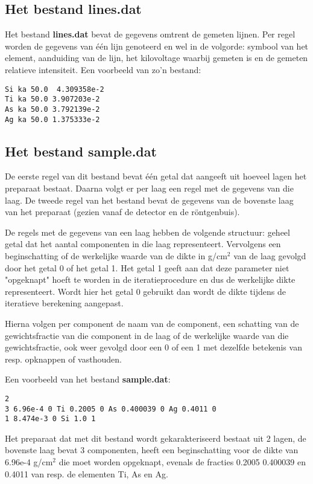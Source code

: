 \subsection*{Het bestand lines.dat}
Het bestand {\bf lines.dat} bevat de gegevens omtrent de gemeten lijnen.
Per regel worden de gegevens van \'e\'en lijn genoteerd en wel in de
volgorde: symbool van het element, aanduiding van de lijn,
het kilovoltage waarbij gemeten is en de gemeten relatieve intensiteit.
Een voorbeeld van zo'n bestand:
\begin{verbatim}
Si ka 50.0  4.309358e-2
Ti ka 50.0 3.907203e-2
As ka 50.0 3.792139e-2
Ag ka 50.0 1.375333e-2
\end{verbatim}
\subsection*{Het bestand sample.dat}
De eerste regel van dit bestand bevat \'e\'en getal dat aangeeft
uit hoeveel lagen het preparaat bestaat. Daarna volgt er per laag
een regel met de gegevens van die laag. De tweede regel van het bestand
bevat de gegevens van de bovenste laag van het preparaat (gezien vanaf
de detector en de r\"ontgenbuis).

De regels met de gegevens van een laag hebben de volgende structuur:
geheel getal dat het aantal componenten in die laag representeert.
Vervolgens een beginschatting of de werkelijke waarde van de 
dikte in g/cm$^2$ van de laag gevolgd door het getal 0 of het getal 1.
Het getal 1 geeft aan dat deze parameter niet "opgeknapt" hoeft te
worden in de iteratieprocedure en dus de werkelijke dikte representeert.
Wordt hier het getal 0 gebruikt dan wordt de dikte tijdens de 
iteratieve berekening aangepast.
 
Hierna volgen per component de naam van de component, een schatting van
 de gewichtsfractie
van die component in de laag of de werkelijke waarde van die gewichtsfractie,
ook weer gevolgd door een 0 of een 1 met dezelfde betekenis van resp. opknappen
of vasthouden.

Een voorbeeld van het bestand {\bf sample.dat}:
\begin{verbatim}
2
3 6.96e-4 0 Ti 0.2005 0 As 0.400039 0 Ag 0.4011 0
1 8.474e-3 0 Si 1.0 1
\end{verbatim}
Het preparaat dat met dit bestand wordt gekarakteriseerd bestaat uit
2 lagen, de bovenste laag bevat 3 componenten, heeft een beginschatting
voor de dikte van 6.96e-4 g/cm$^2$ die moet worden opgeknapt,
evenals de fracties 0.2005 0.400039 en 0.4011 van resp. de elementen
Ti, As en Ag.


